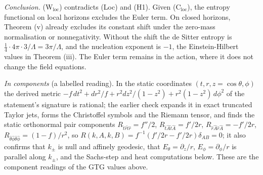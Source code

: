 \emph{Conclusion.} (W$_{\mathrm{loc}}$) contradicts (Loc) and (H1). Given (C$_{\mathrm{loc}}$), the entropy functional on local horizons excludes the Euler term. On closed horizons, Theorem (v) already excludes its constant shift under the zero-mass normalisation or nonnegativity. Without the shift the de Sitter entropy is $\tfrac14\cdot 4\pi\cdot 3/\Lambda = 3\pi/\Lambda$, and the nucleation exponent is $-1$, the Einstein-Hilbert values in Theorem (iii). The Euler term remains in the action, where it does not change the field equations.

\emph{In components} (a labelled reading). In the static coordinates $(t, r, z = \cos\theta, \phi)$ the derived metric $-f\,dt^{2} + dr^{2}/f + r^{2}dz^{2}/(1 - z^{2}) + r^{2}(1 - z^{2})\,d\phi^{2}$ of the statement's signature is rational; the earlier check expands it in exact truncated Taylor jets, forms the Christoffel symbols and the Riemann tensor, and finds the static orthonormal pair components $R_{\hat t\hat r\hat t\hat r} = f''/2$, $R_{\hat t\hat A\hat t\hat A} = f'/2r$, $R_{\hat r\hat A\hat r\hat A} = -f'/2r$, $R_{\hat\theta\hat\phi\hat\theta\hat\phi} = (1 - f)/r^{2}$, so $R(k, A, k, B) = f^{-1}(f'/2r - f'/2r)\delta_{AB} = 0$; it also confirms that $k_{\pm}$ is null and affinely geodesic, that $E_{\theta} = \partial_{z}/r$, $E_{\phi} = \partial_{\phi}/r$ is parallel along $k_{\pm}$, and the Sachs-step and heat computations below. These are the component readings of the GTG values above.

